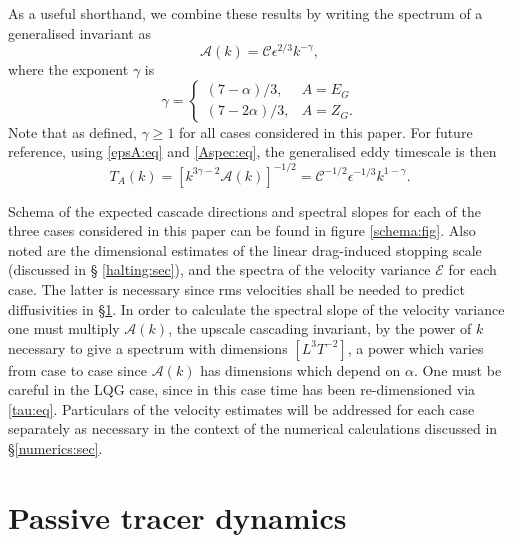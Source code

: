 \documentclass{jfm}
\newcommand{\ca}  [1]{\mathcal{#1}}
\begin{document}
As a useful shorthand, we combine these results by writing the
spectrum of a generalised invariant as
\begin{equation}
\ca{A}(k) = \ca{C}\epsilon^{2/3}k^{-\gamma},
\label{Aspec:eq}
\end{equation}
where the exponent $\gamma$ is
\begin{equation}
\gamma = \left\{
    \begin{array}{ll}
       (7-\alpha)/{3},   &  A = E_G \\
      (7-2\alpha)/{3},   &  A = Z_G.
    \end{array}
\right.
\label{gam:eq}
\end{equation}
Note that as defined, $\gamma\geq 1$ for all cases considered in this
paper.  For future reference, using \eqref{epsA:eq} and
\eqref{Aspec:eq}, the generalised eddy timescale is then
\begin{equation}
T_A(k) = [k^{3\gamma-2}\ca{A}(k)]^{-1/2}
= \ca{C}^{-1/2}\epsilon^{-1/3}k^{1-\gamma}.
\label{TA:eq}
\end{equation}

Schema of the expected cascade directions and spectral slopes for each
of the three cases considered in this paper can be found in figure
\ref{schema:fig}.  Also noted are the dimensional estimates of the
linear drag-induced stopping scale (discussed in \S
\ref{halting:sec}), and the spectra of the velocity variance $\ca{E}$
for each case.  The latter is necessary since rms velocities shall be
needed to predict diffusivities in \S \ref{tracer:sec}.  In order to
calculate the spectral slope of the velocity variance one must
multiply $\ca{A}(k)$, the upscale cascading invariant, by the power of
$k$ necessary to give a spectrum with dimensions $[L^3T^{-2}]$, a
power which varies from case to case since $\ca{A}(k)$ has dimensions
which depend on $\alpha$.  One must be careful in the LQG case, since
in this case time has been re-dimensioned via \eqref{tau:eq}.
Particulars of the velocity estimates will be addressed for each case
separately as necessary in the context of the numerical calculations
discussed in \S \ref{numerics:sec}.

\section{Passive tracer dynamics}
\label{tracer:sec}
\end{document}
